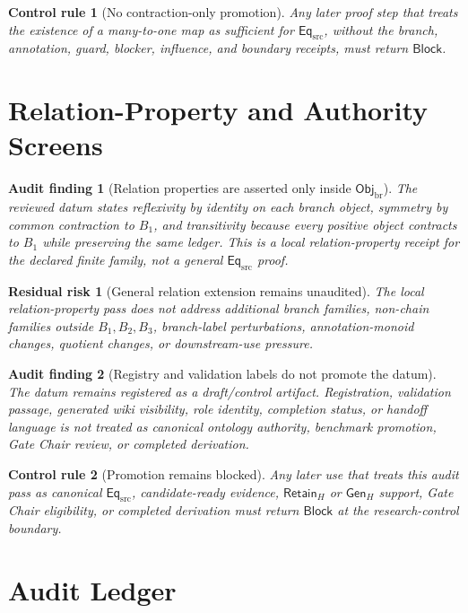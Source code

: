 \documentclass[11pt]{article}
\newcommand{\EqSrc}{\mathsf{Eq}_{\mathrm{src}}}
\newcommand{\ObjBr}{\mathsf{Obj}_{\mathrm{br}}}
\newcommand{\RetainH}{\mathsf{Retain}_{H}}
\newcommand{\GenH}{\mathsf{Gen}_{H}}
\newcommand{\Block}{\mathsf{Block}}
\newtheorem{auditfinding}{Audit finding}
\newtheorem{residualrisk}{Residual risk}
\newtheorem{controlrule}{Control rule}
\begin{document}
\begin{controlrule}[No contraction-only promotion]
Any later proof step that treats the existence of a many-to-one map as
sufficient for \(\EqSrc\), without the branch, annotation, guard,
blocker, influence, and boundary receipts, must return \(\Block\).
\end{controlrule}

\section{Relation-Property and Authority Screens}

\begin{auditfinding}[Relation properties are asserted only inside \(\ObjBr\)]
The reviewed datum states reflexivity by identity on each branch object,
symmetry by common contraction to \(B_{1}\), and transitivity because
every positive object contracts to \(B_{1}\) while preserving the same
ledger. This is a local relation-property receipt for the declared
finite family, not a general \(\EqSrc\) proof.
\end{auditfinding}

\begin{residualrisk}[General relation extension remains unaudited]
The local relation-property pass does not address additional branch
families, non-chain families outside \(B_{1},B_{2},B_{3}\),
branch-label perturbations, annotation-monoid changes, quotient changes,
or downstream-use pressure.
\end{residualrisk}

\begin{auditfinding}[Registry and validation labels do not promote the datum]
The datum remains registered as a draft/control artifact. Registration,
validation passage, generated wiki visibility, role identity, completion
status, or handoff language is not treated as canonical ontology
authority, benchmark promotion, Gate Chair review, or completed
derivation.
\end{auditfinding}

\begin{controlrule}[Promotion remains blocked]
Any later use that treats this audit pass as canonical \(\EqSrc\),
candidate-ready evidence, \(\RetainH\) or \(\GenH\) support, Gate Chair
eligibility, or completed derivation must return \(\Block\) at the
research-control boundary.
\end{controlrule}

\section{Audit Ledger}
\end{document}
